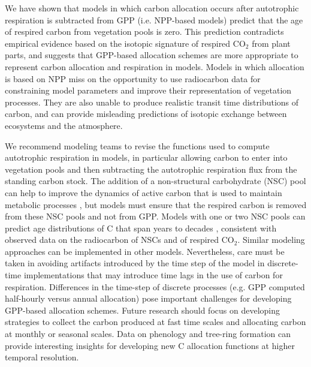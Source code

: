 \documentclass[bg, manuscript]{copernicus}
\begin{document}
We have shown that models in which carbon allocation occurs after autotrophic respiration is subtracted from GPP (i.e. NPP-based models) predict that the age of respired carbon from vegetation pools is zero. This prediction contradicts empirical evidence based on the isotopic signature of respired CO$_2$ from plant parts, and suggests that GPP-based allocation schemes are more appropriate to represent carbon allocation and respiration in models. Models in which allocation is based on NPP miss on the opportunity to use radiocarbon data for constraining model parameters and improve their representation of vegetation processes. They are also unable to produce realistic transit time distributions of carbon, and can provide misleading predictions of isotopic exchange between ecosystems and the atmosphere. 

We recommend modeling teams to revise the functions used to compute autotrophic respiration in models, in particular allowing carbon to enter into vegetation pools and then subtracting the autotrophic respiration flux from the standing carbon stock. The addition of a non-structural carbohydrate (NSC) pool can help to improve the dynamics of active carbon that is used to maintain metabolic processes \citep{Ogle2009, Ceballos2018BG, Herrera2020}, but models must ensure that the respired carbon is removed from these NSC pools and not from GPP. Models with one or two NSC pools can predict age distributions of C that span years to decades \citep{Trumbore:2015, Ceballos2018BG, Herrera2020}, consistent with observed data on the radiocarbon of NSCs and of respired CO$_2$. Similar modeling approaches can be implemented in other models. Nevertheless,
care must be taken in avoiding artifacts introduced by the time step of the model in discrete-time implementations that may introduce time lags in the use of carbon for respiration. Differences in the time-step of discrete processes (e.g. GPP computed half-hourly versus annual allocation) pose important challenges for developing GPP-based allocation schemes.  Future research should focus on developing strategies to collect the carbon produced at fast time scales and allocating carbon at monthly or seasonal scales. Data on phenology \citep{richardson2009, Richardson2018} and tree-ring formation \citep{Giraldo2022} can provide interesting insights for developing new C allocation functions at higher temporal resolution. 
\end{document}
